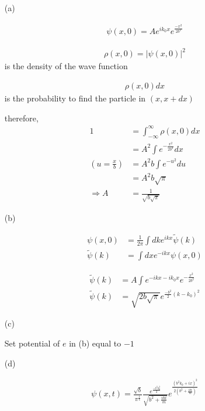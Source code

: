 \documentclass[11pt,a4paper]{article}
\begin{document}
\begin{enumerate}
\item[(a)]

\begin{align*}
\psi(x,0)=Ae^{ik_0x}e^{\frac{-x^2}{2b^2}}
\end{align*}

\begin{align*}
\rho(x,0)=|\psi(x,0)|^2
\end{align*}
is the density of the wave function

\begin{align*}
\rho(x,0)dx
\end{align*}
is the probability to find the particle in $(x,x+dx)$

therefore,
\begin{align*}
1&=\int_{-\infty}^\infty\rho(x,0)dx\\
&=A^2\int e^{-\frac{x^2}{2b^2}}dx\\
(u=\frac{x}{b})&=A^2b\int e^{-u^2}du\\
&=A^2b\sqrt{\pi}\\
\Rightarrow A&=\frac{1}{\sqrt{b\sqrt{\pi}}}
\end{align*}

\end{enumerate}

\begin{enumerate}
\item[(b)]

\begin{align*}
\psi(x,0)&=\frac{1}{2\pi}\int dk e^{ikx}\tilde{\psi}(k)\\
\tilde{\psi}(k)&=\int dx e^{-ikx}\psi(x,0)
\end{align*}

\begin{align*}
\tilde{\psi}(k)&=A\int e^{-ikx-ik_0x}e^{-\frac{x^2}{2b^2}}\\
\tilde{\psi}(k)&=\sqrt{2b\sqrt{\pi}}e^{\frac{-b^2}{2}(k-k_0)^2}
\end{align*}

\end{enumerate}

\begin{enumerate}
\item[(c)]

Set potential of $e$ in (b) equal to $-1$

\end{enumerate}

\begin{enumerate}
\item[(d)]

\begin{align*}
\psi(x,t)=\frac{\sqrt{b}}{\pi^{\frac{1}{4}}}\frac{e^{\frac{-b^2k_0^2}{2}}}{\sqrt{b^2+\frac{i\hbar t}{m}}}e^{\frac{(b^2k_0+ix)^2}{2(b^2+\frac{i\hbar t}{m})}}
\end{align*}

\end{enumerate}
\end{document}
